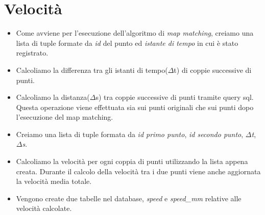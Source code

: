 \documentclass[12pt]{report}
\begin{document}
\chapter*{Velocità}
\begin{itemize}
	\item Come avviene per l'esecuzione dell'algoritmo di \textit{map matching}, creiamo una lista di tuple formate da \textit{id} del punto ed \textit{istante di tempo} in cui è stato registrato.
	\item Calcoliamo la differenza tra gli istanti di tempo($\Delta$t) di coppie successive di punti.
	\item Calcoliamo la distanza($\Delta$s) tra coppie successive di punti tramite query sql. Questa operazione viene effettuata sia sui punti originali che sui punti dopo l'esecuzione del map matching.
	\item Creiamo una lista di tuple formata da \textit{id primo punto}, \textit{id secondo punto}, \textit{$\Delta$t}, \textit{$\Delta$s}.
	\item Calcoliamo la velocità per ogni coppia di punti utilizzando la lista appena creata. Durante il calcolo della velocità tra i due punti viene anche aggiornata la velocità media totale.
	\item Vengono create due tabelle nel database, \textit{speed} e \textit{speed\_mm} relative alle velocità calcolate.
\end{itemize}
\end{document}

